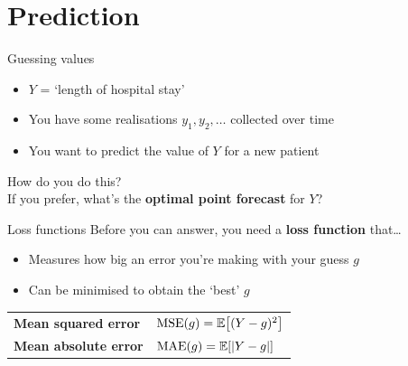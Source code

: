 \section{Prediction}

\begin{frame}{Guessing values}
    \begin{itemize}
        \item $Y$ = `length of hospital stay'
        \item You have some realisations $y_{1}, y_{2}, \ldots$ collected over
              time
        \item You want to predict the value of $Y$ for a new patient
    \end{itemize}
    \vfill\pause
    \begin{center}
        {\Large%
         How do you do this?} \\[1em]
        {If you prefer, what's the \textbf{optimal point forecast} for $Y$?}
    \end{center}
\end{frame}

\begin{frame}{Loss functions}
    Before you can answer, you need a \textbf{loss function} that\ldots
    \begin{itemize}
        \item Measures how big an error you're making with your guess $g$
        \item Can be minimised to obtain the `best' $g$
    \end{itemize}
    \vfill\pause
    \begin{center}
        \renewcommand*{\arraystretch}{1.5}
        \begin{tabular}{ll}
            \toprule
            \textbf{Mean squared error}  & $\operatorname{MSE}(g) = \mathbb{E}\!\left[  (Y - g)^{2} \right]$ \\
            \textbf{Mean absolute error} & $\operatorname{MAE}(g) = \mathbb{E}\!\left[  |Y - g| \right]$ \\
            \bottomrule
        \end{tabular}
    \end{center}
\end{frame}

